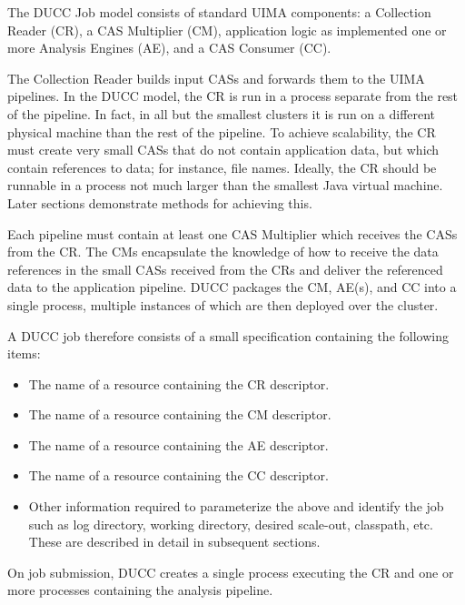     The DUCC Job model consists of standard UIMA components: a Collection Reader (CR), a CAS
    Multiplier (CM), application logic as implemented one or more Analysis Engines (AE), and a CAS
    Consumer (CC).

    The Collection Reader builds input CASs and forwards them to the UIMA pipelines.  In the DUCC
    model, the CR is run in a process separate from the rest of the pipeline. In fact, in all but the
    smallest clusters it is run on a different physical machine than the rest of the pipeline.  To
    achieve scalability, the CR must create very small CASs that do not contain application data,
    but which contain references to data; for instance, file names.  Ideally, the CR should be
    runnable in a process not much larger than the smallest Java virtual machine.  Later sections
    demonstrate methods for achieving this.

    Each pipeline must contain at least one CAS Multiplier which receives the CASs from the CR.  The
    CMs encapsulate the knowledge of how to receive the data references in the small CASs received
    from the CRs and deliver the referenced data to the application pipeline.  DUCC packages the CM,
    AE(s), and CC into a single process, multiple instances of which are then deployed over the
    cluster.

    A DUCC job therefore consists of a small specification containing the following items:
    
    \begin{itemize}
      \item The name of a resource containing the CR descriptor.
      \item The name of a resource containing the CM descriptor.
      \item The name of a resource containing the AE descriptor.
      \item The name of a resource containing the CC descriptor.
      \item Other information required to parameterize the above and identify the job
        such as log directory, working directory, desired scale-out, classpath, etc.
        These are described in detail in subsequent sections.
    \end{itemize}

    On job submission, DUCC creates a single process executing the CR and
    one or more processes containing the analysis pipeline.

